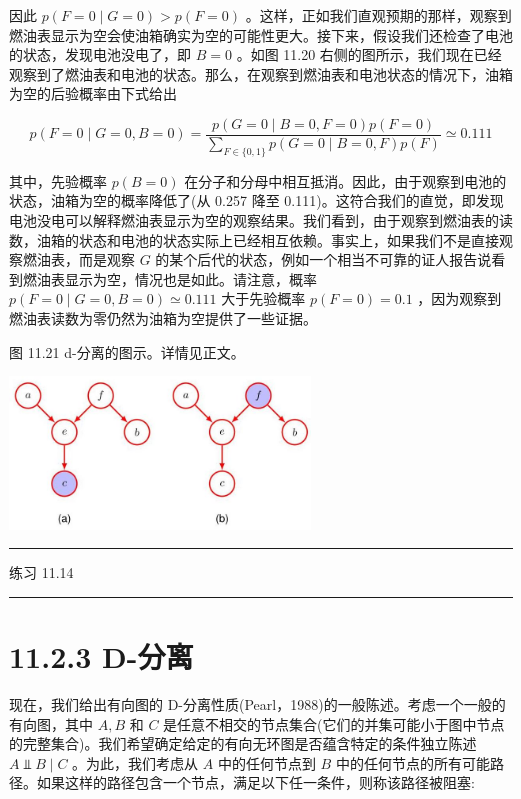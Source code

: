 \documentclass[10pt]{report}
\newcommand{\HRule}{\begin{center}\rule{0.9\linewidth}{0.2mm}\end{center}}
\begin{document}
因此 \(p\left( {F = 0 \mid  G = 0}\right)  > p\left( {F = 0}\right)\) 。这样，正如我们直观预期的那样，观察到燃油表显示为空会使油箱确实为空的可能性更大。接下来，假设我们还检查了电池的状态，发现电池没电了，即 \(B = 0\) 。如图 11.20 右侧的图所示，我们现在已经观察到了燃油表和电池的状态。那么，在观察到燃油表和电池状态的情况下，油箱为空的后验概率由下式给出

\[
p\left( {F = 0 \mid  G = 0,B = 0}\right)  = \frac{p\left( {G = 0 \mid  B = 0,F = 0}\right) p\left( {F = 0}\right) }{\mathop{\sum }\limits_{{F \in  \{ 0,1\} }}p\left( {G = 0 \mid  B = 0,F}\right) p\left( F\right) } \simeq  {0.111} \tag{11.35}
\]

其中，先验概率 \(p\left( {B = 0}\right)\) 在分子和分母中相互抵消。因此，由于观察到电池的状态，油箱为空的概率降低了(从 0.257 降至 0.111)。这符合我们的直觉，即发现电池没电可以解释燃油表显示为空的观察结果。我们看到，由于观察到燃油表的读数，油箱的状态和电池的状态实际上已经相互依赖。事实上，如果我们不是直接观察燃油表，而是观察 \(G\) 的某个后代的状态，例如一个相当不可靠的证人报告说看到燃油表显示为空，情况也是如此。请注意，概率 \(p\left( {F = 0 \mid  G = 0,B = 0}\right)  \simeq  {0.111}\) 大于先验概率 \(p\left( {F = 0}\right)  = {0.1}\) ，因为观察到燃油表读数为零仍然为油箱为空提供了一些证据。

图 11.21 d-分离的图示。详情见正文。

\begin{center}
\includegraphics[max width=0.6\textwidth]{images/0194e279-9b28-703a-88f4-c3ac21e2010d_362_789_341_764_388_0.jpg}
\end{center}
\hspace*{3em} 

\HRule

练习 11.14

\HRule

\section*{11.2.3 D-分离}

现在，我们给出有向图的 D-分离性质(Pearl，1988)的一般陈述。考虑一个一般的有向图，其中 \(A,B\) 和 \(C\) 是任意不相交的节点集合(它们的并集可能小于图中节点的完整集合)。我们希望确定给定的有向无环图是否蕴含特定的条件独立陈述 \(A ⫫ B \mid  C\) 。为此，我们考虑从 \(A\) 中的任何节点到 \(B\) 中的任何节点的所有可能路径。如果这样的路径包含一个节点，满足以下任一条件，则称该路径被阻塞:
\end{document}
